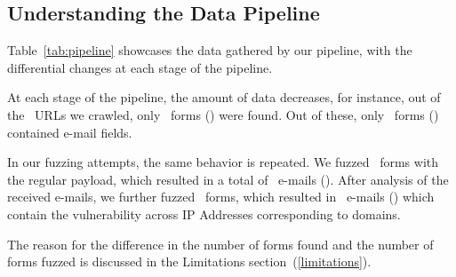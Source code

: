 \subsection[The Pipeline]{Understanding the Data Pipeline}
Table~\ref{tab:pipeline} showcases the data gathered by our pipeline, with the differential changes at each stage of the pipeline. 

At each stage of the pipeline, the amount of data decreases, for instance, out of the \urls\ URLs we crawled, only \forms\ forms (\formsDelta) were found. Out of these, only \emailforms\ forms (\emailformsDelta) contained e-mail fields.

In our fuzzing attempts, the same behavior is repeated. We fuzzed \fuzzed\ forms with the regular payload, which resulted in a total of \recd\ e-mails (\recdDelta). After analysis of the received e-mails, we further fuzzed \malfuzzed\ forms, which resulted in \success\ e-mails (\successDelta) which contain the vulnerability across \ips IP Addresses corresponding to \domains domains.

The reason for the difference in the number of forms found and the number of forms fuzzed is discussed in the Limitations section~(\ref{limitations}).




